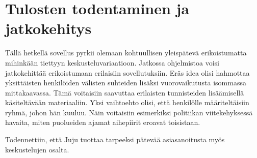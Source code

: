 \documentclass[11pt,a4paper,oneside]{memoir}
\begin{document}
\chapter{Tulosten todentaminen ja jatkokehitys}
Tällä hetkellä sovellus pyrkii olemaan kohtuullisen yleispätevä erikoistumatta mihinkään tiettyyn keskusteluvariaatioon. Jatkossa ohjelmistoa voisi jatkokehittää erikoistumaan erilaisiin sovellutuksiin. Eräs idea olisi hahmottaa yksittäisten henkilöiden välisten suhteiden lisäksi vuorovaikutusta isommassa mittakaavassa. Tämä voitaisiin saavuttaa erilaisten tunnisteiden lisäämisellä käsiteltävään materiaaliin. Yksi vaihtoehto olisi, että henkilölle määriteltäisiin ryhmä, johon hän kuuluu. Näin voitaisiin esimerkiksi politiikan viitekehyksessä havaita, miten puolueiden ajamat aihepiirit eroavat toisistaan.

Todennettiin, että Juju tuottaa tarpeeksi pätevää asiasanoitusta myös keskustelujen osalta.



\singlespacing
\begin{flushleft}

\end{flushleft}
\end{document}
